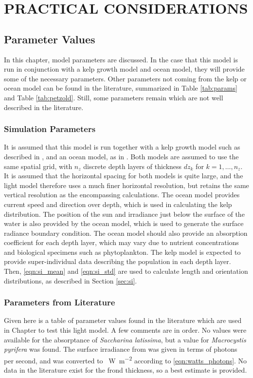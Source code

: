\chapter{PRACTICAL CONSIDERATIONS}
\label{chap:application}

\section{Parameter Values}
\label{sec:parameters}
In this chapter, model parameters are discussed.
In the case that this model is run in conjunction with a kelp growth model and ocean model,
they will provide some of the necessary parameters.
Other parameters not coming from the kelp or ocean model can be found in the literature,
summarized in Table \ref{tab:params} and Table \ref{tab:petzold}.
Still, some parameters remain which are not well described in the literature.

\subsection{Simulation Parameters}
It is assumed that this model is run together with a kelp growth model such as described in \citep{broch_modelling_2012}, and an ocean model, as in \citep{wassmann_modelling_2006}.
Both models are assumed to use the same spatial grid, with $n_z$ discrete depth layers of thickness $dz_k$ for $k=1,\ldots,n_z$.
It is assumed that the horizontal spacing for both models is quite large, and the light model therefore uses a much finer horizontal resolution,
but retains the same vertical resolution as the encompassing calculations.
The ocean model provides current speed and direction over depth, which is used in calculating the kelp distribution.
The position of the sun and irradiance just below the surface of the water is also provided by the ocean model, which is used to generate the surface radiance boundary condition.
The ocean model should also provide an absorption coefficient for each depth layer, which may vary due to nutrient concentrations and biological specimens such as phytoplankton.
The kelp model is expected to provide super-individual data describing the population in each depth layer.
Then, \eqref{eqn:si_mean} and \eqref{eqn:si_std} are used to calculate length and orientation distributions, as described in Section \ref{sec:si}.

\subsection{Parameters from Literature}
Given here is a table of parameter values found in the literature which are used in Chapter \Rom{\ref{chap:model_analysis}} to test this light model.
A few comments are in order.
No values were available for the absorptance of \textit{Saccharina latissima}, but a value for \textit{Macrocystis pyrifera} was found.
The surface irradiance from \cite{broch_modelling_2012} was given in terms of photons per second,
and was converted to \SI{}{\W\per\m\squared} according to \eqref{eqn:watts_photons}.
No data in the literature exist for the frond thickness, so a best estimate is provided.

